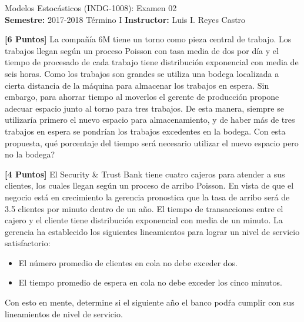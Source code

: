 \documentclass[ a4paper, twoside, 11pt]{article}
\newcommand{\numero}{02}
\begin{document}
\allowdisplaybreaks

\begin{center}
\Large Modelos Estoc\'asticos (INDG-1008): Examen \numero \\[1ex]
\small \textbf{Semestre:} 2017-2018 T\'ermino I \qquad
\textbf{Instructor:} Luis I. Reyes Castro
\end{center}
\halfskip



\halfskip

\begin{problem}
\textbf{[6 Puntos]} La compa\~n\'ia 6M tiene un torno como pieza central de trabajo. Los trabajos llegan seg\'un un proceso Poisson con tasa media de dos por d\'ia y el tiempo de procesado de cada trabajo tiene distribuci\'on exponencial con media de seis horas. Como los trabajos son grandes se utiliza una bodega localizada a cierta distancia de la m\'aquina para almacenar los trabajos en espera. Sin embargo, para ahorrar tiempo al moverlos el gerente de producci\'on propone adecuar espacio junto al torno para tres trabajos. De esta manera, siempre se utilizar\'ia primero el nuevo espacio para almacenamiento, y de haber m\'as de tres trabajos en espera se pondr\'ian los trabajos excedentes en la bodega. Con esta propuesta, qu\'e porcentaje del tiempo ser\'a necesario utilizar el nuevo espacio pero no la bodega? 

\end{problem}
\vspace{\baselineskip}

\begin{problem}
\textbf{[4 Puntos]} El Security \& Trust Bank tiene cuatro cajeros para atender a sus clientes, los cuales llegan seg\'un un proceso de arribo Poisson. En vista de que el negocio est\'a en crecimiento la gerencia pronostica que la tasa de arribo ser\'a de 3.5 clientes por minuto dentro de un a\~no. El tiempo de transacciones entre el cajero y el cliente tiene distribuci\'on exponencial con media de un minuto. La gerencia ha establecido los siguientes lineamientos para lograr un nivel de servicio satisfactorio: 
\begin{itemize}
\item El n\'umero promedio de clientes en cola no debe exceder dos. 
\item El tiempo promedio de espera en cola no debe exceder los cinco minutos. 
\end{itemize}

Con esto en mente, determine si el siguiente a\~no el banco pod\'ra cumplir con sus lineamientos de nivel de servicio. 

\end{problem}
\vspace{\baselineskip}
\end{document}
